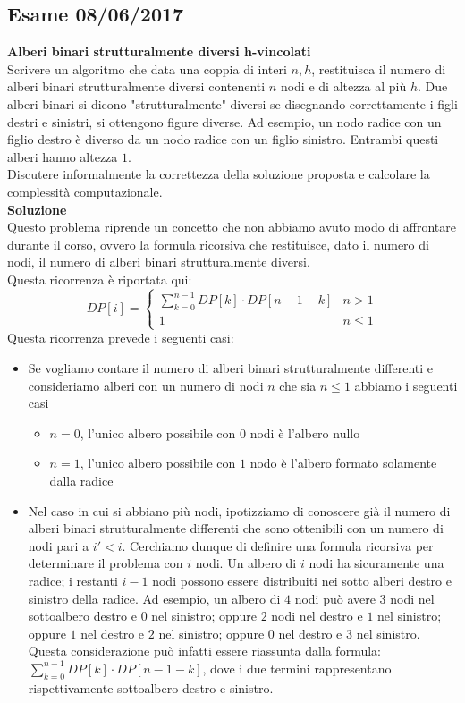 \documentclass[../cheatSheetAlgoritmi.tex]{subfiles}
\begin{document}
\subsection{Esame 08/06/2017}
\textbf{Alberi binari strutturalmente diversi h-vincolati} \\
Scrivere un algoritmo che data una coppia di interi $n, h$, restituisca il numero di alberi binari strutturalmente diversi contenenti $n$ nodi e di altezza al più $h$. 
Due alberi binari si dicono "strutturalmente" diversi se disegnando correttamente i figli destri e sinistri, si ottengono figure diverse. 
Ad esempio, un nodo radice con un figlio destro è diverso da un nodo radice con un figlio sinistro. Entrambi questi alberi hanno altezza $1$. \\
Discutere informalmente la correttezza della soluzione proposta e calcolare la complessità computazionale. \\
\textbf{Soluzione} \\
Questo problema riprende un concetto che non abbiamo avuto modo di affrontare durante il corso, ovvero la formula ricorsiva che restituisce, dato il numero di nodi, il numero di alberi binari strutturalmente diversi. \\
Questa ricorrenza è riportata qui: 
\begin{equation*}
  	DP[i] =\begin{cases}
    	\sum_{k = 0}^{n - 1} DP[k] \cdot DP[n - 1 - k] & \text{$n > 1$}\\
    	1 & \text{$n \leq 1$}
  	\end{cases}
\end{equation*}
Questa ricorrenza prevede i seguenti casi: 
\begin{itemize}
	\item Se vogliamo contare il numero di alberi binari strutturalmente differenti e consideriamo alberi con un numero di nodi $n$ che sia $n\leq 1$ abbiamo i seguenti casi
	\begin{itemize}
		\item $n = 0$, l'unico albero possibile con $0$ nodi è l'albero nullo
		\item $n = 1$, l'unico albero possibile con $1$ nodo è l'albero formato solamente dalla radice
	\end{itemize}
	\item Nel caso in cui si abbiano più nodi, ipotizziamo di conoscere già il numero di alberi binari strutturalmente differenti che sono ottenibili con un numero di nodi pari a $i' < i$. Cerchiamo dunque di definire una formula ricorsiva per determinare il problema con $i$ nodi.  Un albero di $i$ nodi ha sicuramente una radice; i restanti $i-1$ nodi possono essere distribuiti nei sotto alberi destro e sinistro della radice. Ad esempio, un albero di $4$ nodi può avere $3$ nodi nel sottoalbero destro e $0$ nel sinistro; oppure $2$ nodi nel destro e $1$ nel sinistro; oppure $1$ nel destro e $2$ nel sinistro; oppure $0$ nel destro e $3$ nel sinistro. Questa considerazione può infatti essere riassunta dalla formula: $\sum_{k = 0}^{n - 1} DP[k] \cdot DP[n - 1 - k]$, dove i due termini rappresentano rispettivamente sottoalbero destro e sinistro.
\end{itemize}
\end{document}
